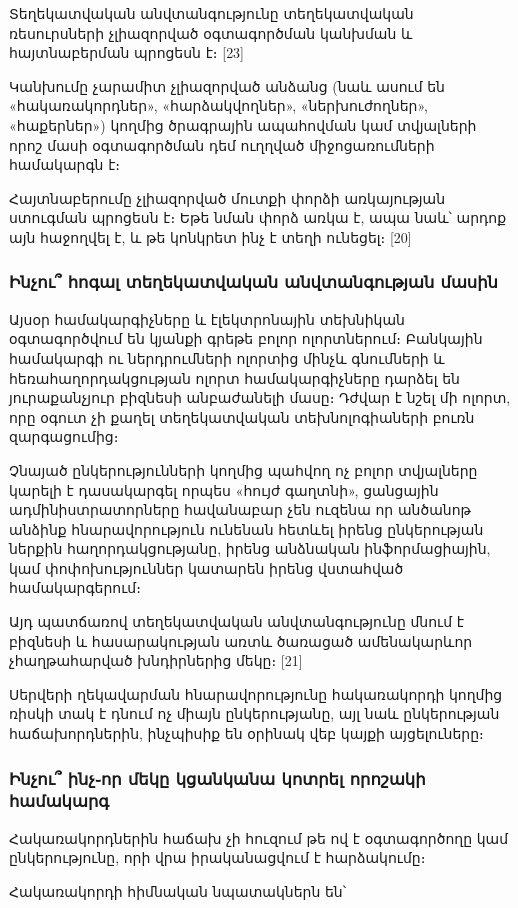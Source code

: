 \documentclass[a4paper,12pt]{article}
\begin{document}
\begin{sloppypar}
Տեղեկատվական անվտանգությունը տեղեկատվական ռեսուրսների չլիազորված օգտագործման
կանխման և հայտնաբերման պրոցեսն է։ [23]

Կանխումը չարամիտ չլիազորված անձանց (նաև ասում են «հակառակորդներ»,
«հարձակվողներ», «ներխուժողներ», «հաքերներ») կողմից ծրագրային ապահովման կամ
տվյալների որոշ մասի օգտագործման դեմ ուղղված միջոցառումների համակարգն է։

Հայտնաբերումը չլիազորված մուտքի փորձի առկայության ստուգման պրոցեսն է։ Եթե
նման փորձ առկա է, ապա նաև՝ արդոք այն հաջողվել է, և թե կոնկրետ ինչ է տեղի
ունեցել։ [20]

\subsubsection{Ինչու՞ հոգալ տեղեկատվական անվտանգության մասին}

Այսօր համակարգիչները և էլեկտրոնային տեխնիկան օգտագործվում են
կյանքի գրեթե բոլոր ոլորտներում։ Բանկային համակարգի ու ներդրումների ոլորտից
մինչև գնումների և հեռահաղորդակցության ոլորտ համակարգիչները դարձել են
յուրաքանչյուր բիզնեսի անբաժանելի մասը։ Դժվար է նշել մի ոլորտ, որը
օգուտ չի քաղել տեղեկատվական տեխնոլոգիաների բուռն զարգացումից։

Չնայած ընկերությունների կողմից պահվող ոչ բոլոր տվյալները կարելի է
դասակարգել որպես «հույժ գաղտնի», ցանցային ադմինիստրատորները հավանաբար
չեն ուզենա որ անծանոթ անձինք հնարավորություն ունենան հետևել
իրենց ընկերության ներքին հաղորդակցությանը,
իրենց անձնական ինֆորմացիային, կամ փոփոխություններ կատարեն իրենց վստահված
համակարգերում։

Այդ պատճառով տեղեկատվական անվտանգությունը մնում է բիզնեսի և հասարակության
առտև ծառացած ամենակարևոր չհաղթահարված խնդիրներից մեկը։ [21]

Սերվերի ղեկավարման հնարավորությունը հակառակորդի կողմից ռիսկի տակ է
դնում ոչ միայն ընկերությանը, այլ նաև ընկերության հաճախորդներին, ինչպիսիք են
օրինակ վեբ կայքի այցելուները։


\subsubsection{Ինչու՞ ինչ֊որ մեկը կցանկանա կոտրել որոշակի համակարգ}


Հակառակորդներին հաճախ չի հուզում թե ով է օգտագործողը կամ ընկերությունը,
որի վրա իրականացվում է հարձակումը։

Հակառակորդի հիմնական նպատակներն են՝


\end{sloppypar}
\end{document}
